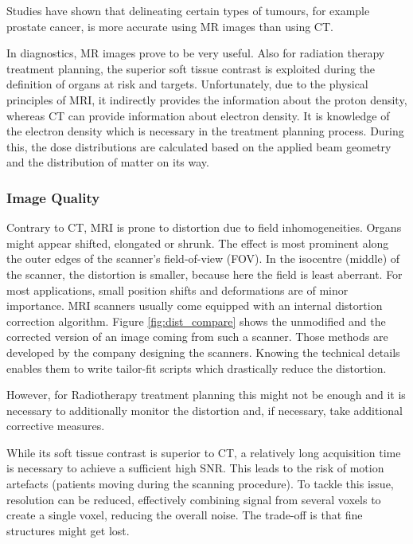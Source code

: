 Studies have shown that delineating certain types of tumours, for example prostate cancer, is more accurate using MR images than using CT. \cite{Rasch1999, Debois1999a, Roach1996}

In diagnostics, MR images prove to be very useful.
Also for radiation therapy treatment planning, the superior soft tissue contrast is exploited during the definition of organs at risk and targets.
Unfortunately, due to the physical principles of MRI, it indirectly provides the information about the proton density, whereas CT can provide information about electron density.
It is knowledge of the electron density which is necessary in the treatment planning process.
During this, the dose distributions are calculated based on the applied beam geometry and the distribution of matter on its way.


\subsubsection{Image Quality}
Contrary to CT, MRI is prone to distortion due to field inhomogeneities.
Organs might appear shifted, elongated or shrunk.
The effect is most prominent along the outer edges of the scanner's field-of-view (FOV).
In the isocentre (middle) of the scanner, the distortion is smaller, because here the field is least aberrant.
For most applications, small position shifts and deformations are of minor importance.
MRI scanners usually come equipped with an internal distortion correction algorithm.
Figure \ref{fig:dist_compare} shows the unmodified and the corrected version of an image coming from such a scanner.
Those methods are developed by the company designing the scanners.
Knowing the technical details enables them to write tailor-fit scripts which drastically reduce the distortion.

However, for Radiotherapy treatment planning this might not be enough and it is necessary to additionally monitor the distortion and, if necessary, take additional corrective measures. 

While its soft tissue contrast is superior to CT, a relatively long acquisition time is necessary to achieve a sufficient high SNR.
This leads to the risk of motion artefacts (patients moving during the scanning procedure).
To tackle this issue, resolution can be reduced, effectively combining signal from several voxels to create a single voxel, reducing the overall noise.
The trade-off is that fine structures might get lost.

